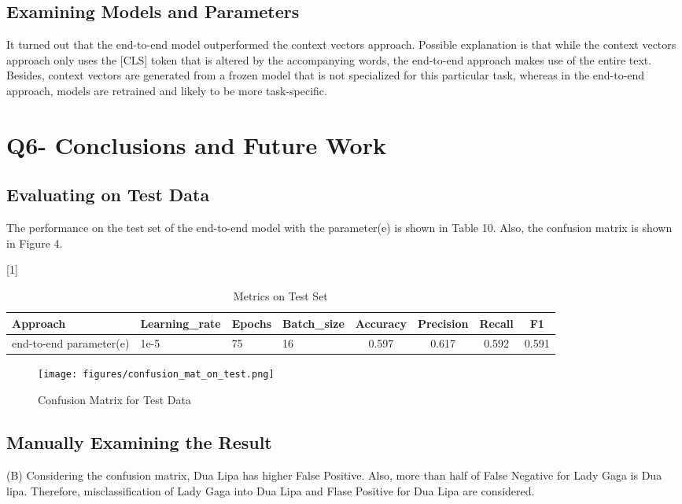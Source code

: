 \documentclass[a4paper,11pt]{article}
\begin{document}
\subsection{Examining Models and Parameters}
It turned out that the end-to-end model outperformed the context vectors approach.
Possible explanation is  that while the context vectors approach only uses the [CLS] token that is altered by the accompanying words,
the end-to-end approach makes use of the entire text.
Besides, context vectors are generated from a frozen model that is not specialized for this particular task,
whereas in the end-to-end approach, models are retrained and likely to be more task-specific.


\section{Q6- Conclusions and Future Work}
\subsection{Evaluating on Test Data}
The performance on the test set of the end-to-end model with the parameter(e) is shown in Table 10.
Also, the confusion matrix is shown in Figure 4.
\begin{table}[htbp]
    \centering
    \caption{Metrics on Test Set}
    \small
    \scalebox{1}[1]{
    \begin{tabular}{l|lll|cccc}
         Approach & Learning\_rate & Epochs & Batch\_size & Accuracy & Precision & Recall & F1 \\ \hline 
         end-to-end parameter(e)                  & 1e-5& 75& 16  & 0.597 & 0.617 & 0.592  & 0.591 \\
    \end{tabular}
    }
\end{table}

\begin{figure}[H]
  \begin{center}
  \texttt{[image: figures/confusion\_mat\_on\_test.png]}
  \caption{Confusion Matrix for Test Data}
  \end{center}
\end{figure}

\subsection{Manually Examining the Result}
(B)
Considering the confusion matrix, Dua Lipa has higher False Positive.
Also, more than half of False Negative for Lady Gaga is Dua lipa.
Therefore, misclassification of Lady Gaga into Dua Lipa and Flase Positive for Dua Lipa are considered.
\end{document}
